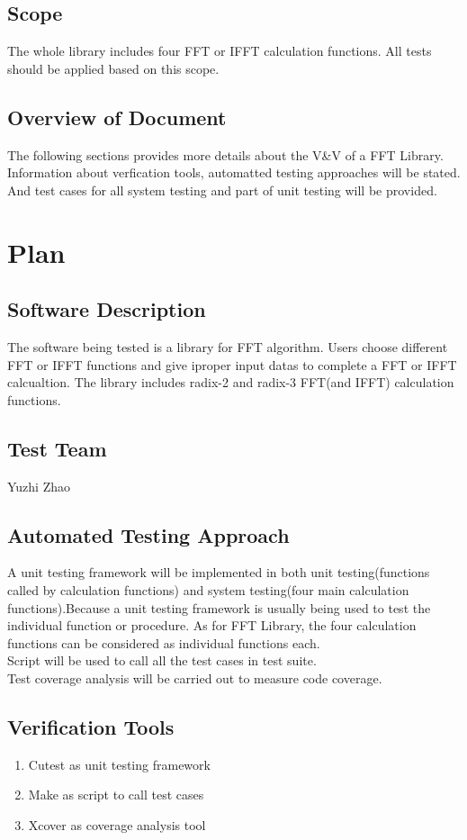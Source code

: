 \documentclass[12pt, titlepage]{article}
\begin{document}
\subsection{Scope}
The whole library includes four FFT or IFFT calculation functions. All tests should be applied based on this scope.

\subsection{Overview of Document}
The following sections provides more details about the V\&V of a FFT Library. Information about verfication tools, automatted testing approaches will be stated. And
test cases for all system testing and part of unit testing will be provided.
\section{Plan}
	
\subsection{Software Description}
The software being tested is a library for FFT algorithm. Users choose different  FFT or IFFT functions and give iproper input datas to complete a FFT or IFFT calcualtion. 
The library includes radix-2 and radix-3 FFT(and IFFT) calculation functions.
\subsection{Test Team}
Yuzhi Zhao

\subsection{Automated Testing Approach}
A unit testing framework will be implemented in both unit testing(functions called by calculation functions) and system testing(four main calculation functions).Because a unit testing framework is usually being used to test the individual function or procedure. As for FFT Library, the four calculation functions can be considered as individual functions each.\\
Script will be used to call all the test cases in test suite.\\
Test coverage analysis will be carried out to measure code coverage.\\

\subsection{Verification Tools}
\begin{enumerate}
\item {{\large Cutest} as unit testing framework}
\item {{\large Make} as script to call test cases}
\item {{\large Xcover} as coverage analysis tool}
\end{enumerate}
\end{document}
